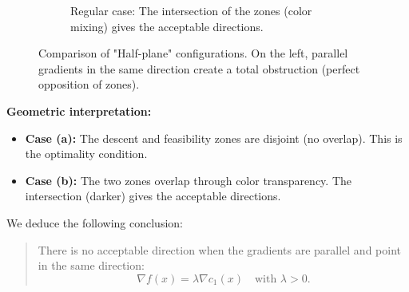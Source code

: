 \begin{figure}[H]
\begin{subfigure}[b]{0.45\textwidth}
    \caption{Regular case: The intersection of the zones (color mixing) gives the acceptable directions.}
\end{subfigure}
\caption{Comparison of "Half-plane" configurations. On the left, parallel gradients in the same direction create a total obstruction (perfect opposition of zones).}
\label{fig:admissible-comparison}
\end{figure}

\begin{figureexplanation}
\textbf{Geometric interpretation:}
\begin{itemize}
    \item \textbf{Case (a):} The descent and feasibility zones are disjoint (no overlap). This is the optimality condition.
    \item \textbf{Case (b):} The two zones overlap through color transparency. The intersection (darker) gives the acceptable directions.
\end{itemize}
\end{figureexplanation}

We deduce the following conclusion:
\begin{quote}
There is no acceptable direction when the gradients are parallel and point in the same direction:
\begin{equation}
    \nabla f(x) = \lambda \nabla c_1(x) \quad \text{with } \lambda > 0.
\end{equation}
\end{quote}

